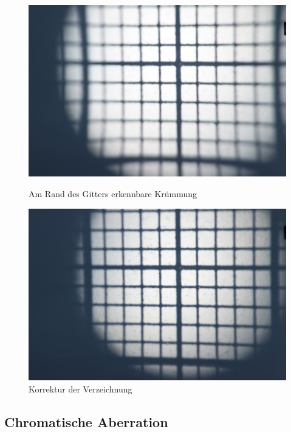 \begin{figure}[htb]
	\begin{minipage}[t]{0.48\textwidth}
		\includegraphics[width=\linewidth]{img/Verzeichnung/Prakt_Linsenfehler_2015_06_04_082}
		\caption{Am Rand des Gitters erkennbare Krümmung}
		\label{fig:verzeichnung}
	\end{minipage}
	\hfill
	\begin{minipage}[t]{0.48\textwidth}
		\includegraphics[width=\linewidth]{img/Verzeichnung/Prakt_Linsenfehler_2015_06_04_083}
		\caption{Korrektur der Verzeichnung}
		\label{fig:verzeichnung_korrigiert}
	\end{minipage}
\end{figure}

\subsection{Chromatische Aberration}

